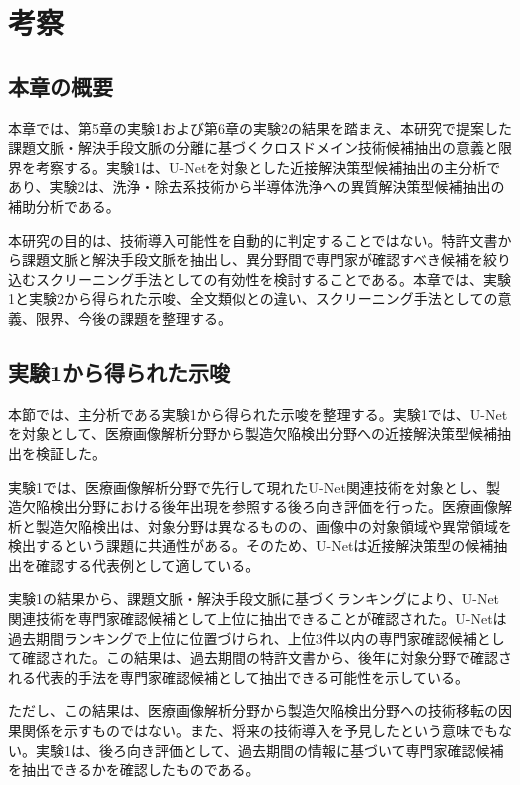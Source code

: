 \chapter{考察}

\section{本章の概要}

本章では、第5章の実験1および第6章の実験2の結果を踏まえ、本研究で提案した課題文脈・解決手段文脈の分離に基づくクロスドメイン技術候補抽出の意義と限界を考察する。実験1は、U-Netを対象とした近接解決策型候補抽出の主分析であり、実験2は、洗浄・除去系技術から半導体洗浄への異質解決策型候補抽出の補助分析である。

本研究の目的は、技術導入可能性を自動的に判定することではない。特許文書から課題文脈と解決手段文脈を抽出し、異分野間で専門家が確認すべき候補を絞り込むスクリーニング手法としての有効性を検討することである。本章では、実験1と実験2から得られた示唆、全文類似との違い、スクリーニング手法としての意義、限界、今後の課題を整理する。

\section{実験1から得られた示唆}




本節では、主分析である実験1から得られた示唆を整理する。実験1では、U-Netを対象として、医療画像解析分野から製造欠陥検出分野への近接解決策型候補抽出を検証した。

実験1では、医療画像解析分野で先行して現れたU-Net関連技術を対象とし、製造欠陥検出分野における後年出現を参照する後ろ向き評価を行った。医療画像解析と製造欠陥検出は、対象分野は異なるものの、画像中の対象領域や異常領域を検出するという課題に共通性がある。そのため、U-Netは近接解決策型の候補抽出を確認する代表例として適している。

実験1の結果から、課題文脈・解決手段文脈に基づくランキングにより、U-Net関連技術を専門家確認候補として上位に抽出できることが確認された。U-Netは過去期間ランキングで上位に位置づけられ、上位3件以内の専門家確認候補として確認された。この結果は、過去期間の特許文書から、後年に対象分野で確認される代表的手法を専門家確認候補として抽出できる可能性を示している。

ただし、この結果は、医療画像解析分野から製造欠陥検出分野への技術移転の因果関係を示すものではない。また、将来の技術導入を予見したという意味でもない。実験1は、後ろ向き評価として、過去期間の情報に基づいて専門家確認候補を抽出できるかを確認したものである。

